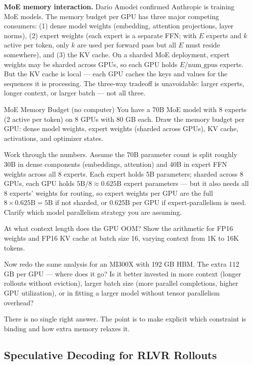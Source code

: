 \textbf{MoE memory interaction.} Dario Amodei confirmed Anthropic is training MoE models. The memory budget per GPU has three major competing consumers: (1) dense model weights (embedding, attention projections, layer norms), (2) expert weights (each expert is a separate FFN; with $E$ experts and $k$ active per token, only $k$ are used per forward pass but all $E$ must reside somewhere), and (3) the KV cache. On a sharded MoE deployment, expert weights may be sharded across GPUs, so each GPU holds $E / \text{num\_gpus}$ experts. But the KV cache is local --- each GPU caches the keys and values for the sequences it is processing. The three-way tradeoff is unavoidable: larger experts, longer context, or larger batch --- not all three.

\begin{thinkfirst}{MoE Memory Budget (no computer)}
You have a 70B MoE model with 8 experts (2 active per token) on 8 GPUs with 80 GB each. Draw the memory budget per GPU: dense model weights, expert weights (sharded across GPUs), KV cache, activations, and optimizer states.

Work through the numbers. Assume the 70B parameter count is split roughly 30B in dense components (embeddings, attention) and 40B in expert FFN weights across all 8 experts. Each expert holds 5B parameters; sharded across 8 GPUs, each GPU holds $5\text{B} / 8 \approx 0.625\text{B}$ expert parameters --- but it also needs all 8 experts' weights for routing, so expert weights per GPU are the full $8 \times 0.625\text{B} = 5\text{B}$ if not sharded, or $0.625\text{B}$ per GPU if expert-parallelism is used. Clarify which model parallelism strategy you are assuming.

At what context length does the GPU OOM? Show the arithmetic for FP16 weights and FP16 KV cache at batch size 16, varying context from 1K to 16K tokens.

Now redo the same analysis for an MI300X with 192 GB HBM. The extra 112 GB per GPU --- where does it go? Is it better invested in more context (longer rollouts without eviction), larger batch size (more parallel completions, higher GPU utilization), or in fitting a larger model without tensor parallelism overhead?

There is no single right answer. The point is to make explicit which constraint is binding and how extra memory relaxes it.
\end{thinkfirst}

\subsection{Speculative Decoding for RLVR Rollouts}

